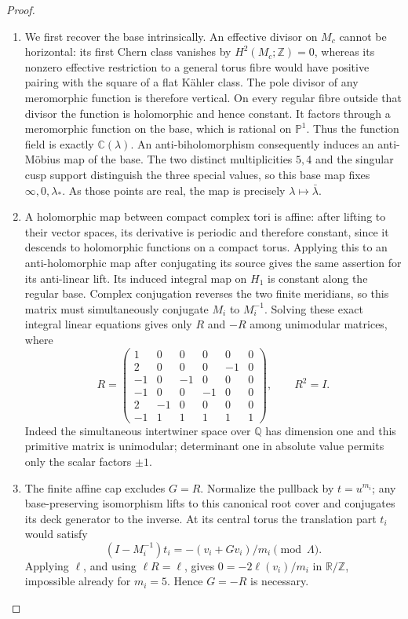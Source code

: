 \begin{proof}
\begin{enumerate}[label={$\langle1\rangle$\arabic*.}]
\item We first recover the base intrinsically.  An effective divisor on
$M_c$ cannot be horizontal: its first Chern class vanishes by
$H^2(M_c;\mathbb Z)=0$, whereas its nonzero effective restriction to a
general torus fibre would have positive pairing with the square of a
flat K\"ahler class.  The pole divisor of any meromorphic function is
therefore vertical.  On every regular fibre outside that divisor the
function is holomorphic and hence constant.  It factors through a
meromorphic function on the base, which is rational on
$\mathbb P^1$.  Thus the function field is exactly $\mathbb C(\lambda)$.
An anti-biholomorphism consequently induces an anti-M\"obius map of
the base.  The two distinct multiplicities $5,4$ and the singular cusp
support distinguish the three special values, so this base map fixes
$\infty,0,\lambda_*$.  As those points are real, the map is precisely
$\lambda\mapsto\bar\lambda$.

\item A holomorphic map between compact complex tori is affine: after
lifting to their vector spaces, its derivative is periodic and
therefore constant, since it descends to holomorphic functions on a
compact torus.  Applying this to an anti-holomorphic map after
conjugating its source gives the same assertion for its anti-linear
lift.  Its induced integral map on $H_1$ is constant along the
regular base.  Complex conjugation reverses the two finite meridians,
so this matrix must simultaneously conjugate $M_i$ to $M_i^{-1}$.
Solving these exact integral linear equations gives only $R$ and
$-R$ among unimodular matrices, where
\[
R=\begin{pmatrix}
1&0&0&0&0&0\\
2&0&0&0&-1&0\\
-1&0&-1&0&0&0\\
-1&0&0&-1&0&0\\
2&-1&0&0&0&0\\
-1&1&1&1&1&1
\end{pmatrix},\qquad R^2=I.
\]
Indeed the simultaneous intertwiner space over $\mathbb Q$ has
dimension one and this primitive matrix is unimodular; determinant
one in absolute value permits only the scalar factors $\pm1$.


\item The finite affine cap excludes $G=R$.  Normalize the pullback by
$t=u^{m_i}$; any base-preserving isomorphism lifts to this canonical
root cover and conjugates its deck generator to the inverse.
At its central torus the translation part $t_i$ would satisfy
\[
(I-M_i^{-1})t_i=-(v_i+Gv_i)/m_i\pmod\Lambda.
\]
Applying $\ell$, and using $\ell R=\ell$, gives
$0=-2\ell(v_i)/m_i$ in $\mathbb R/\mathbb Z$, impossible already
for $m_i=5$.  Hence $G=-R$ is necessary.


\end{enumerate}
\end{proof}
